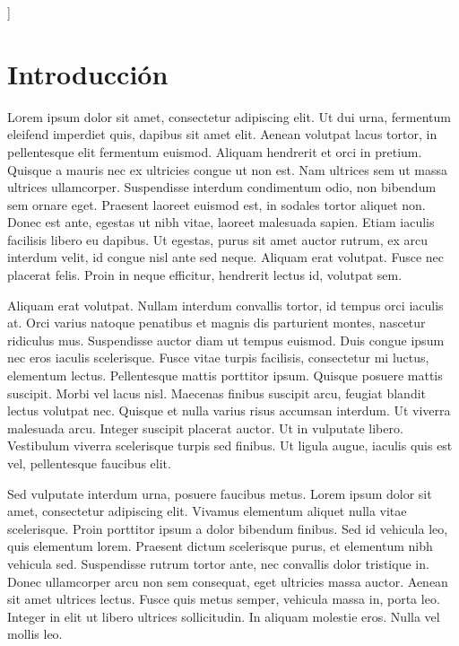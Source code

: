 \documentclass[a4paper,openright,12pt]{report}
\begin{document}
]

\section*{Introducción}


\lettrine{L}orem ipsum dolor sit amet, consectetur adipiscing elit. Ut dui urna, fermentum eleifend imperdiet quis, dapibus sit amet elit. Aenean volutpat lacus tortor, in pellentesque elit fermentum euismod. Aliquam hendrerit et orci in pretium. Quisque a mauris nec ex ultricies congue ut non est. Nam ultrices sem ut massa ultrices ullamcorper. Suspendisse interdum condimentum odio, non bibendum sem ornare eget. Praesent laoreet euismod est, in sodales tortor aliquet non. Donec est ante, egestas ut nibh vitae, laoreet malesuada sapien. Etiam iaculis facilisis libero eu dapibus. Ut egestas, purus sit amet auctor rutrum, ex arcu interdum velit, id congue nisl ante sed neque. Aliquam erat volutpat. Fusce nec placerat felis. Proin in neque efficitur, hendrerit lectus id, volutpat sem.

Aliquam erat volutpat. Nullam interdum convallis tortor, id tempus orci iaculis at. Orci varius natoque penatibus et magnis dis parturient montes, nascetur ridiculus mus. Suspendisse auctor diam ut tempus euismod. Duis congue ipsum nec eros iaculis scelerisque. Fusce vitae turpis facilisis, consectetur mi luctus, elementum lectus. Pellentesque mattis porttitor ipsum. Quisque posuere mattis suscipit. Morbi vel lacus nisl. Maecenas finibus suscipit arcu, feugiat blandit lectus volutpat nec. Quisque et nulla varius risus accumsan interdum. Ut viverra malesuada arcu. Integer suscipit placerat auctor. Ut in vulputate libero. Vestibulum viverra scelerisque turpis sed finibus. Ut ligula augue, iaculis quis est vel, pellentesque faucibus elit.

Sed vulputate interdum urna, posuere faucibus metus. Lorem ipsum dolor sit amet, consectetur adipiscing elit. Vivamus elementum aliquet nulla vitae scelerisque. Proin porttitor ipsum a dolor bibendum finibus. Sed id vehicula leo, quis elementum lorem. Praesent dictum scelerisque purus, et elementum nibh vehicula sed. Suspendisse rutrum tortor ante, nec convallis dolor tristique in. Donec ullamcorper arcu non sem consequat, eget ultricies massa auctor. Aenean sit amet ultrices lectus. Fusce quis metus semper, vehicula massa in, porta leo. Integer in elit ut libero ultrices sollicitudin. In aliquam molestie eros. Nulla vel mollis leo.


\newpage
\end{document}
